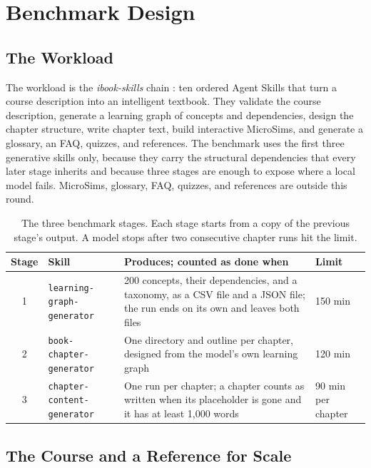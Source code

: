 \section{Benchmark Design}
\label{sec:design}

\subsection{The Workload}

The workload is the \textit{ibook-skills} chain \cite{ibookskills}: ten ordered Agent Skills that turn a course description into an intelligent textbook. They validate the course description, generate a learning graph of concepts and dependencies, design the chapter structure, write chapter text, build interactive MicroSims, and generate a glossary, an FAQ, quizzes, and references. The benchmark uses the first three generative skills only, because they carry the structural dependencies that every later stage inherits and because three stages are enough to expose where a local model fails. MicroSims, glossary, FAQ, quizzes, and references are outside this round.

\begin{table}[htbp]
\centering
\small
\begin{tabularx}{\textwidth}{@{}clXl@{}}
\toprule
\textbf{Stage} & \textbf{Skill} & \textbf{Produces; counted as done when} & \textbf{Limit} \\
\midrule
1 & \texttt{learning-graph-generator} & 200 concepts, their dependencies, and a taxonomy, as a CSV file and a JSON file; the run ends on its own and leaves both files & 150 min \\
2 & \texttt{book-chapter-generator} & One directory and outline per chapter, designed from the model's own learning graph & 120 min \\
3 & \texttt{chapter-content-generator} & One run per chapter; a chapter counts as written when its placeholder is gone and it has at least 1,000 words & 90 min per chapter \\
\bottomrule
\end{tabularx}
\caption{The three benchmark stages. Each stage starts from a copy of the previous stage's output. A model stops after two consecutive chapter runs hit the limit.}
\label{tab:stages}
\end{table}

\subsection{The Course and a Reference for Scale}

